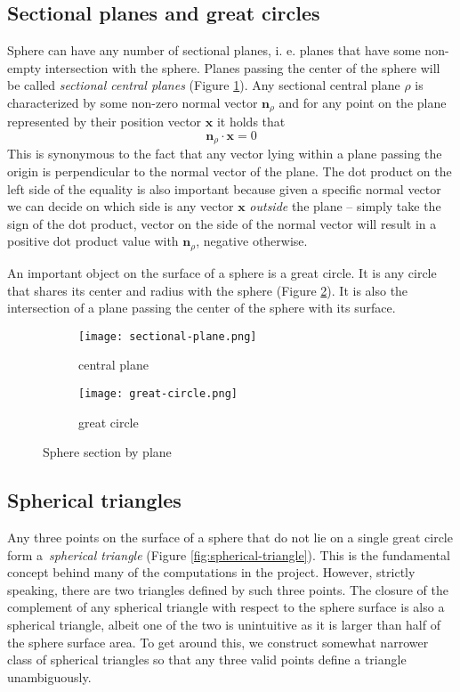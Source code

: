 \subsection{Sectional planes and great circles}
Sphere can have any number of sectional planes, i. e. planes that have some non-empty intersection with the sphere. Planes passing the center of the sphere will be called \textit{sectional central planes} (Figure \ref{fig:sectional-plane}). Any sectional central plane $\rho$ is characterized by some non-zero normal vector $\textbf{n}_\rho$ and for any point on the plane represented by their position vector $\mathbf{x}$ it holds that
$$\mathbf{n}_\rho\cdot\mathbf{x}=0$$
This is synonymous to the fact that any vector lying within a plane passing the origin is perpendicular to the normal vector of the plane. The dot product on the left side of the equality is also important because given a specific normal vector we can decide on which side is any vector $\mathbf{x}$ \textit{outside} the plane -- simply take the sign of the dot product, vector on the side of the normal vector will result in a positive dot product value with $\mathbf{n}_\rho$, negative otherwise.

An important object on the surface of a sphere is a great circle. It is any circle that shares its center and radius with the sphere (Figure \ref{fig:great-circle}). It is also the intersection of a plane passing the center of the sphere with its surface.
\begin{figure}[ht]
\centering
\begin{subfigure}{7cm}
\texttt{[image: sectional-plane.png]}
\caption{central plane}
\label{fig:sectional-plane}
\end{subfigure}
\begin{subfigure}{7cm}
\texttt{[image: great-circle.png]}
\caption{great circle}
\label{fig:great-circle}
\end{subfigure}
\caption{Sphere section by plane}
\label{fig:sectional-objects}
\end{figure}

\subsection{Spherical triangles}
\label{subsec:spherical-triangles}
Any three points on the surface of a sphere that do not lie on a single great circle form a~\textit{spherical triangle} (Figure \ref{fig:spherical-triangle}). This is the fundamental concept behind many of the computations in the project. However, strictly speaking, there are two triangles defined by such three points. The closure of the complement of any spherical triangle with respect to the sphere surface is also a spherical triangle, albeit one of the two is unintuitive as it is larger than half of the sphere surface area. To get around this, we construct somewhat narrower class of spherical triangles so that any three valid points define a triangle unambiguously.

